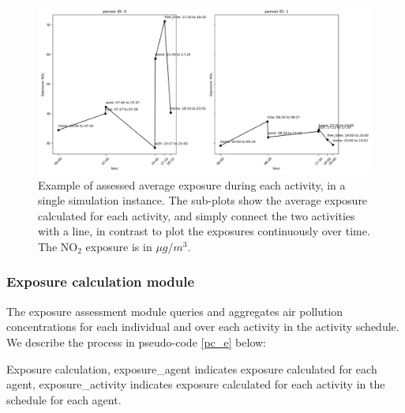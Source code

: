 \documentclass[]{article}
\begin{document}
\begin{figure}[!h]
    \centering
    \includegraphics[width=12cm]{figure/exposure_act1.png}
    \caption{Example of assessed average exposure during each activity, in a single simulation instance. The sub-plots show the average exposure calculated for each activity, and simply connect the two activities with a line, in contrast to plot the exposures continuously over time. The NO$_2$ exposure is in $\mu g/m^3$.}
    \label{exp_act}
\end{figure}


\subsubsection{Exposure calculation module}
\label{exposureassess}

The exposure assessment module queries and aggregates air pollution concentrations for each individual and over each activity in the activity schedule. We describe the process in pseudo-code \cref{pc_e} below: 
 
\begin{algorithm}[H]
 
 \caption{Exposure calculation, exposure\_agent indicates exposure calculated for each agent, exposure\_activity indicates exposure calculated for each activity in the schedule for each agent.}
 \label{pc_e}
\end{algorithm}
\end{document}
